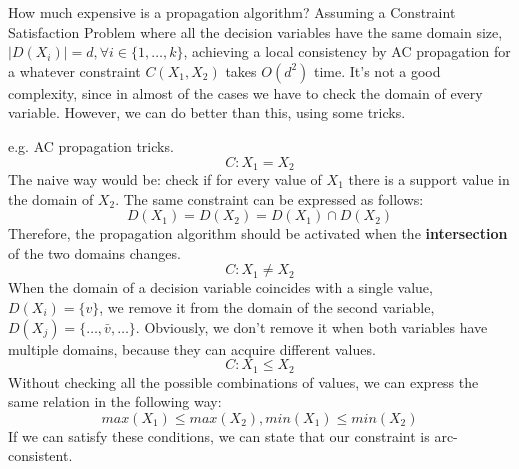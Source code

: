 How much expensive is a propagation algorithm? Assuming a Constraint Satisfaction Problem where all the decision variables have the same domain size,
$|D(X_i)| = d, \forall i \in \{1, \dots, k\}$, achieving a local consistency by AC propagation for a whatever constraint $C(X_1, X_2)$ takes
$O(d^2)$ time. It's not a good complexity, since in almost of the cases we have to check the domain of every variable. However, we can do better than this,
using some tricks.
\begin{example}
    e.g. AC propagation tricks.
    $$ C: X_1 = X_2 $$
    The naive way would be: check if for every value of $X_1$ there is a support value in the domain of $X_2$. The same constraint can be expressed as follows:
    $$ D(X_1) = D(X_2) = D(X_1) \cap D(X_2) $$
    Therefore, the propagation algorithm should be activated when the \textbf{intersection} of the two domains changes.
    $$ C: X_1 \neq X_2 $$
    When the domain of a decision variable coincides with a single value, $D(X_i) = \{v\}$, we remove it from the domain of the second variable, $D(X_j) = 
    \{\dots, \bar{v}, \dots\}$. Obviously, we don't remove it when both variables have multiple domains, because they can acquire different values.
    $$ C: X_1 \leq X_2 $$
    Without checking all the possible combinations of values, we can express the same relation in the following way:
    $$ max(X_1) \leq max(X_2), min(X_1) \leq min(X_2) $$
    If we can satisfy these conditions, we can state that our constraint is arc-consistent.
\end{example}